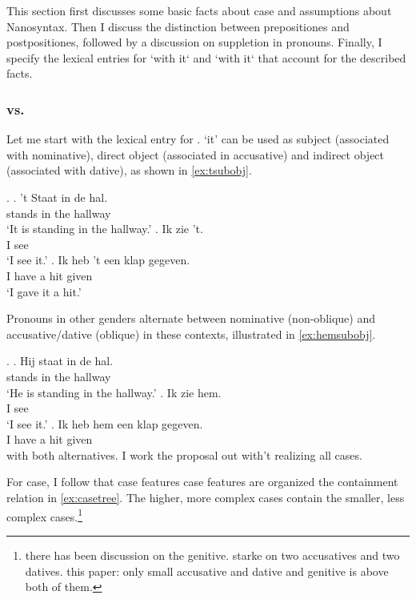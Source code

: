 \documentclass[12pt]{article}
\begin{document}
This section first discusses some basic facts about case and assumptions about Nanosyntax. Then I discuss the distinction between prepositiones and postpositiones, followed by a discussion on suppletion in pronouns. Finally, I specify the lexical entries for  `with it` and  `with it` that account for the described facts.



\subsubsection{ vs. }

Let me start with the lexical entry for .  `it' can be used as subject (associated with nominative), direct object (associated in accusative) and indirect object (associated with dative), as shown in \ref{ex:tsubobj}.

\ex.\label{ex:tsubobj}
\ag. 't Staat in de hal.\\
  stands in the hallway\\
 `It is standing in the hallway.'\label{ex:tnoclitic}
\bg. Ik zie 't.\\
 I see \\
 `I see it.'
\bg. Ik heb 't een klap gegeven.\\
 I have  a hit given\\
 `I gave it a hit.'

 Pronouns in other genders alternate between nominative (non-oblique) and accusative/dative (oblique) in these contexts, illustrated in \ref{ex:hemsubobj}.

 \ex.\label{ex:hemsubobj}
 \ag. Hij staat in de hal.\\
   stands in the hallway\\
  `He is standing in the hallway.'
 \bg. Ik zie hem.\\
  I see \\
  `I see it.'
 \bg. Ik heb hem een klap gegeven.\\
  I have  a hit given\\ with both alternatives. I work the proposal out with't  realizing all cases.

For case, I follow \citet{caha2009} that case features case features are organized the containment relation in \ref{ex:casetree}. The higher, more complex cases contain the smaller, less complex cases.\footnote{there has been discussion on the genitive. starke on two accusatives and two datives. this paper: only small accusative and dative and genitive is above both of them.}
\end{document}
